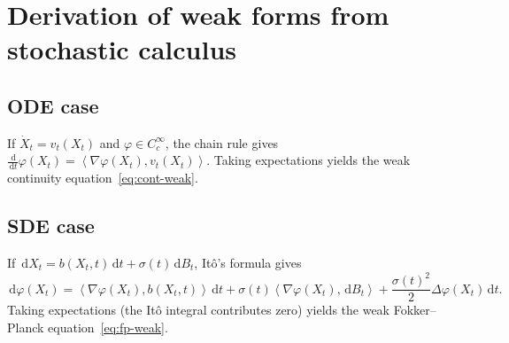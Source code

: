 \documentclass[11pt]{article}
\newcommand{\grad}{\nabla}
\newcommand{\inner}[2]{\left\langle #1,#2 \right\rangle}
\newcommand{\dd}{\,\mathrm{d}}
\theoremstyle{definition}
\theoremstyle{remark}
\begin{document}
\newpage

\appendix

\section{Derivation of weak forms from stochastic calculus}\label{app:weak-forms}

\subsection{ODE case}
If $\dot{X}_t = v_t(X_t)$ and $\varphi\in C_c^\infty$, the chain rule gives $\frac{\dd}{\dd t}\varphi(X_t) = \inner{\grad\varphi(X_t)}{v_t(X_t)}$.
Taking expectations yields the weak continuity equation~\eqref{eq:cont-weak}.

\subsection{SDE case}
If $\dd X_t = b(X_t,t)\dd t + \sigma(t)\dd B_t$, It\^o's formula gives
\[
\dd\varphi(X_t) = \inner{\grad\varphi(X_t)}{b(X_t,t)}\dd t + \sigma(t)\inner{\grad\varphi(X_t)}{\dd B_t} + \frac{\sigma(t)^2}{2}\Delta\varphi(X_t)\dd t.
\]
Taking expectations (the It\^o integral contributes zero) yields the weak Fokker--Planck equation~\eqref{eq:fp-weak}.
\end{document}
